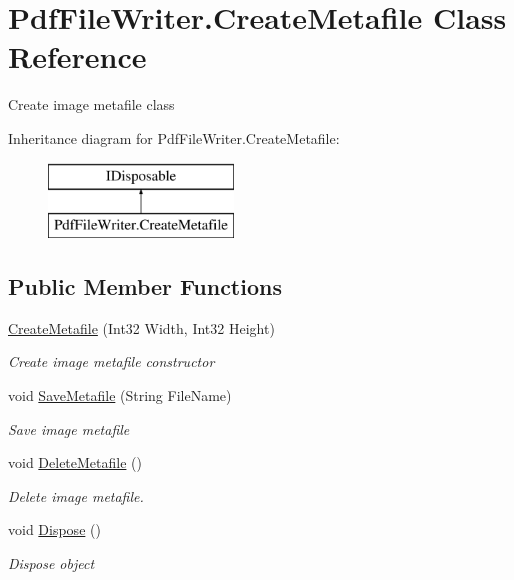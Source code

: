 \hypertarget{class_pdf_file_writer_1_1_create_metafile}{}\section{Pdf\+File\+Writer.\+Create\+Metafile Class Reference}
\label{class_pdf_file_writer_1_1_create_metafile}


Create image metafile class  


Inheritance diagram for Pdf\+File\+Writer.\+Create\+Metafile\+:\begin{figure}[H]
\begin{center}
\leavevmode
\includegraphics[height=2.000000cm]{class_pdf_file_writer_1_1_create_metafile}
\end{center}
\end{figure}
\subsection*{Public Member Functions}
\begin{DoxyCompactItemize}
\item 
\hyperlink{class_pdf_file_writer_1_1_create_metafile_a9ece3945e088a9df77e7a121f0c41209}{Create\+Metafile} (Int32 Width, Int32 Height)
\begin{DoxyCompactList}\small\item\em Create image metafile constructor \end{DoxyCompactList}\item 
void \hyperlink{class_pdf_file_writer_1_1_create_metafile_ac15dc3f77a1e8ecd5bcca4b491b8767f}{Save\+Metafile} (String File\+Name)
\begin{DoxyCompactList}\small\item\em Save image metafile \end{DoxyCompactList}\item 
void \hyperlink{class_pdf_file_writer_1_1_create_metafile_a04bf647788c7723fabad559d7a78dbf5}{Delete\+Metafile} ()
\begin{DoxyCompactList}\small\item\em Delete image metafile. \end{DoxyCompactList}\item 
void \hyperlink{class_pdf_file_writer_1_1_create_metafile_a2cdde5857d335105a1d1ecbe00966267}{Dispose} ()
\begin{DoxyCompactList}\small\item\em Dispose object \end{DoxyCompactList}\end{DoxyCompactItemize}
